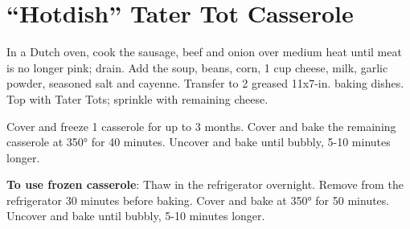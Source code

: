 \section{``Hotdish'' Tater Tot Casserole}
\begin{recipe}





    In a Dutch oven, cook the sausage, beef and onion over medium heat until meat is no longer pink; drain. Add the soup, beans, corn, 1 cup cheese, milk, garlic powder, seasoned salt and cayenne. Transfer to 2 greased 11x7-in. baking dishes. Top with Tater Tots; sprinkle with remaining cheese.

	Cover and freeze 1 casserole for up to 3 months. Cover and bake the remaining casserole at 350° for 40 minutes. Uncover and bake until bubbly, 5-10 minutes longer.

	\textbf{To use frozen casserole}: Thaw in the refrigerator overnight. Remove from the refrigerator 30 minutes before baking.	Cover and bake at 350° for 50 minutes. Uncover and bake until bubbly, 5-10 minutes longer.


\end{recipe}
